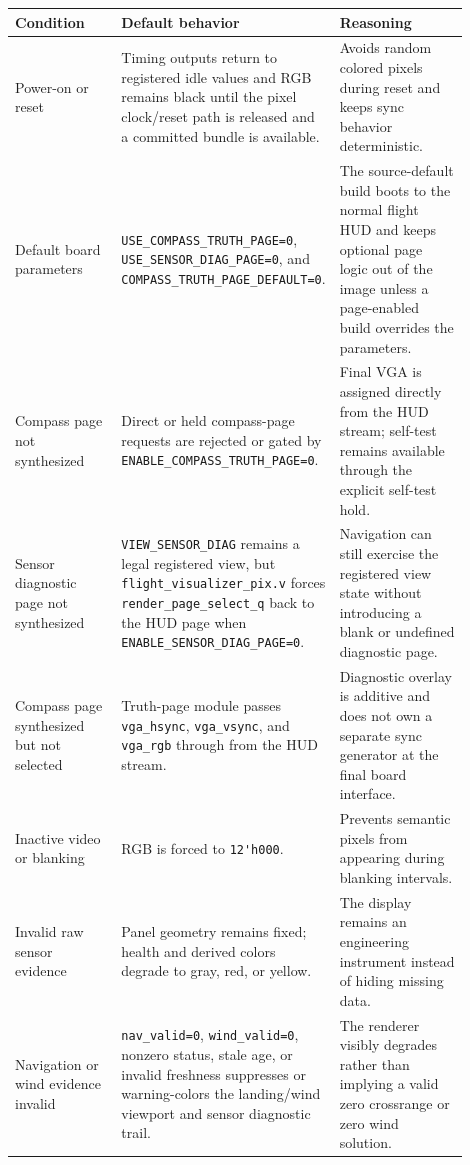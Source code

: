 \documentclass{article}
\newcommand{\sig}[1]{\begingroup\nolinkurl{#1}\endgroup}
\newcommand{\file}[1]{\begingroup\nolinkurl{#1}\endgroup}
\newcommand{\param}[1]{\begingroup\nolinkurl{#1}\endgroup}
\begin{document}
\begin{longtable}{p{0.26\linewidth} p{0.32\linewidth} p{0.32\linewidth}}
\toprule
\textbf{Condition} & \textbf{Default behavior} & \textbf{Reasoning} \\
\midrule
\endhead
Power-on or reset &
Timing outputs return to registered idle values and RGB remains black until the
pixel clock/reset path is released and a committed bundle is available. &
Avoids random colored pixels during reset and keeps sync behavior deterministic. \\

Default board parameters &
\param{USE_COMPASS_TRUTH_PAGE=0}, \param{USE_SENSOR_DIAG_PAGE=0}, and
\param{COMPASS_TRUTH_PAGE_DEFAULT=0}. &
The source-default build boots to the normal flight HUD and keeps optional page
logic out of the image unless a page-enabled build overrides the parameters. \\

Compass page not synthesized &
Direct or held compass-page requests are rejected or gated by
\param{ENABLE_COMPASS_TRUTH_PAGE=0}. &
Final VGA is assigned directly from the HUD stream; self-test remains available
through the explicit self-test hold. \\

Sensor diagnostic page not synthesized &
\sig{VIEW_SENSOR_DIAG} remains a legal registered view, but
\file{flight_visualizer_pix.v} forces \sig{render_page_select_q} back to the
HUD page when \param{ENABLE_SENSOR_DIAG_PAGE=0}. &
Navigation can still exercise the registered view state without introducing a
blank or undefined diagnostic page. \\

Compass page synthesized but not selected &
Truth-page module passes \sig{vga_hsync}, \sig{vga_vsync}, and
\sig{vga_rgb} through from the HUD stream. &
Diagnostic overlay is additive and does not own a separate sync generator at
the final board interface. \\

Inactive video or blanking &
RGB is forced to \sig{12'h000}. &
Prevents semantic pixels from appearing during blanking intervals. \\

Invalid raw sensor evidence &
Panel geometry remains fixed; health and derived colors degrade to gray, red,
or yellow. &
The display remains an engineering instrument instead of hiding missing data. \\

Navigation or wind evidence invalid &
\sig{nav_valid=0}, \sig{wind_valid=0}, nonzero status, stale age, or invalid
freshness suppresses or warning-colors the landing/wind viewport and sensor
diagnostic trail. &
The renderer visibly degrades rather than implying a valid zero crossrange or
zero wind solution. \\


\end{longtable}
\end{document}
